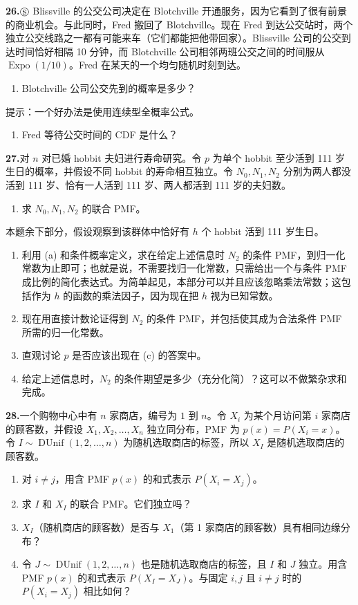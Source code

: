 \documentclass[UTF8, 12pt, fontset=fandol, oneside]{ctexart}
\begin{document}
\noindent\textbf{26.}\quad $\circledS$ Blissville 的公交公司决定在 Blotchville 开通服务，因为它看到了很有前景的商业机会。与此同时，Fred 搬回了 Blotchville。现在 Fred 到达公交站时，两个独立公交线路之一都有可能来车（它们都能把他带回家）。Blissville 公司的公交到达时间恰好相隔 10 分钟，而 Blotchville 公司相邻两班公交之间的时间服从 $\operatorname{Expo}(1/10)$。Fred 在某天的一个均匀随机时刻到达。
\begin{enumerate}
  \item[(a)] Blotchville 公司公交先到的概率是多少？
\end{enumerate}
提示：一个好办法是使用连续型全概率公式。
\begin{enumerate}
  \item[(b)] Fred 等待公交时间的 CDF 是什么？
\end{enumerate}

\noindent\textbf{27.}\quad 对 $n$ 对已婚 hobbit 夫妇进行寿命研究。令 $p$ 为单个 hobbit 至少活到 111 岁生日的概率，并假设不同 hobbit 的寿命相互独立。令 $N_0,N_1,N_2$ 分别为两人都没活到 111 岁、恰有一人活到 111 岁、两人都活到 111 岁的夫妇数。
\begin{enumerate}
  \item[(a)] 求 $N_0,N_1,N_2$ 的联合 PMF。
\end{enumerate}
本题余下部分，假设观察到该群体中恰好有 $h$ 个 hobbit 活到 111 岁生日。
\begin{enumerate}
  \item[(b)] 利用 (a) 和条件概率定义，求在给定上述信息时 $N_2$ 的条件 PMF，到归一化常数为止即可；也就是说，不需要找归一化常数，只需给出一个与条件 PMF 成比例的简化表达式。为简单起见，本部分可以并且应该忽略乘法常数；这包括作为 $h$ 的函数的乘法因子，因为现在把 $h$ 视为已知常数。
  \item[(c)] 现在用直接计数论证得到 $N_2$ 的条件 PMF，并包括使其成为合法条件 PMF 所需的归一化常数。
  \item[(d)] 直观讨论 $p$ 是否应该出现在 (c) 的答案中。
  \item[(e)] 给定上述信息时，$N_2$ 的条件期望是多少（充分化简）？这可以不做繁杂求和完成。
\end{enumerate}

\noindent\textbf{28.}\quad 一个购物中心中有 $n$ 家商店，编号为 $1$ 到 $n$。令 $X_i$ 为某个月访问第 $i$ 家商店的顾客数，并假设 $X_1,X_2,\ldots,X_n$ 独立同分布，PMF 为 $p(x)=P(X_i=x)$。令 $I\sim \operatorname{DUnif}(1,2,\ldots,n)$ 为随机选取商店的标签，所以 $X_I$ 是随机选取商店的顾客数。
\begin{enumerate}
  \item[(a)] 对 $i\ne j$，用含 PMF $p(x)$ 的和式表示 $P(X_i=X_j)$。
  \item[(b)] 求 $I$ 和 $X_I$ 的联合 PMF。它们独立吗？
  \item[(c)] $X_I$（随机商店的顾客数）是否与 $X_1$（第 1 家商店的顾客数）具有相同边缘分布？
  \item[(d)] 令 $J\sim \operatorname{DUnif}(1,2,\ldots,n)$ 也是随机选取商店的标签，且 $I$ 和 $J$ 独立。用含 PMF $p(x)$ 的和式表示 $P(X_I=X_J)$。与固定 $i,j$ 且 $i\ne j$ 时的 $P(X_i=X_j)$ 相比如何？
\end{enumerate}
\end{document}
